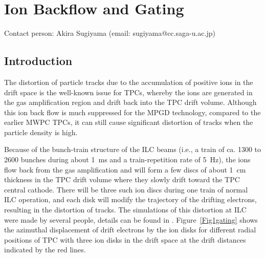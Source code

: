 \section{Ion Backflow and Gating}\label{chap:TPC_sec:gating}
Contact person: Akira Sugiyama (email: sugiyama@cc.saga-u.ac.jp)\\

\subsection{Introduction}

The distortion of particle tracks due to the accumulation of positive ions in the drift space is the well-known
issue for TPCs, whereby the ions are generated in the gas amplification region and drift back into the TPC drift volume.
Although this ion back flow is much suppressed for the MPGD technology, compared to the earlier MWPC TPCs, it can
still cause significant distortion of tracks when the particle density is high.

Because of the bunch-train structure of the ILC beams (i.e., a  train of ca. 1300 to 2600 bunches during
about \SI{1}{ms}
and a train-repetition rate of \SI{5}{Hz}), the ions flow back from the gas amplification and will form a few discs
of about \SI{1}{cm} thickness in the TPC drift volume where they slowly drift toward the TPC central cathode.
There will be three such ion discs during one train of normal ILC operation, and each disk will modify the trajectory
of the drifting electrons, resulting in the distortion of tracks. The simulations of this distortion at ILC
were made by several people, details can be found in \cite{LC-DET-2012-079,Fujii_IonEffects}.
Figure~\ref{Fig1gating} shows the azimuthal displacement of drift electrons by the ion
disks for different radial positions of TPC with three ion disks in the drift space at the drift distances
indicated by the red lines.


